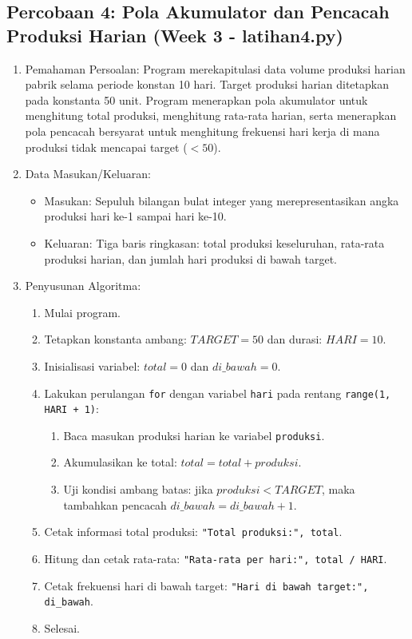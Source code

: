 \documentclass[12pt,a4paper]{article}
\begin{document}
\subsection{Percobaan 4: Pola Akumulator dan Pencacah Produksi Harian (Week 3 - latihan4.py)}
\begin{enumerate}
    \item Pemahaman Persoalan: Program merekapitulasi data volume produksi harian pabrik selama periode konstan 10 hari. Target produksi harian ditetapkan pada konstanta 50 unit. Program menerapkan pola akumulator untuk menghitung total produksi, menghitung rata-rata harian, serta menerapkan pola pencacah bersyarat untuk menghitung frekuensi hari kerja di mana produksi tidak mencapai target ($< 50$).
    \item Data Masukan/Keluaran:
    \begin{itemize}
        \item Masukan: Sepuluh bilangan bulat integer yang merepresentasikan angka produksi hari ke-1 sampai hari ke-10.
        \item Keluaran: Tiga baris ringkasan: total produksi keseluruhan, rata-rata produksi harian, dan jumlah hari produksi di bawah target.
    \end{itemize}
    \item Penyusunan Algoritma:
    \begin{enumerate}[label=\alph*.]
        \item Mulai program.
        \item Tetapkan konstanta ambang: $TARGET = 50$ dan durasi: $HARI = 10$.
        \item Inisialisasi variabel: $total = 0$ dan $di\_bawah = 0$.
        \item Lakukan perulangan \texttt{for} dengan variabel \texttt{hari} pada rentang \texttt{range(1, HARI + 1)}:
        \begin{enumerate}[label=\roman*.]
            \item Baca masukan produksi harian ke variabel \texttt{produksi}.
            \item Akumulasikan ke total: $total = total + produksi$.
            \item Uji kondisi ambang batas: jika $produksi < TARGET$, maka tambahkan pencacah $di\_bawah = di\_bawah + 1$.
        \end{enumerate}
        \item Cetak informasi total produksi: \texttt{"Total produksi:", total}.
        \item Hitung dan cetak rata-rata: \texttt{"Rata-rata per hari:", total / HARI}.
        \item Cetak frekuensi hari di bawah target: \texttt{"Hari di bawah target:", di\_bawah}.
        \item Selesai.
    \end{enumerate}
\end{enumerate}
\end{document}
